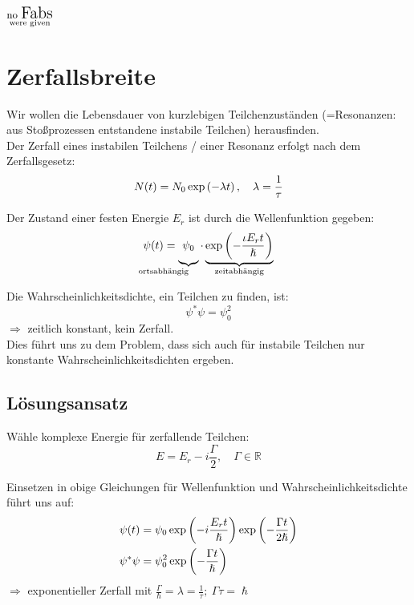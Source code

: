 \documentclass[Ex4_Zusammenfassung.tex]{subfiles}
\begin{document}
\textbf{$\mathop{\text{\small{no} \Large Fabs}}\limits_{\text{were given}}$}
\section{Zerfallsbreite}
Wir wollen die Lebensdauer von kurzlebigen Teilchenzuständen (=Resonanzen: aus Stoßprozessen entstandene instabile Teilchen) herausfinden.\\

Der Zerfall eines instabilen Teilchens / einer Resonanz erfolgt nach dem Zerfallsgesetz:
\begin{equation}
	N(t) = N_0 \exp \left( - \lambda t \right), \quad \lambda = \frac{1}{\tau}
\end{equation}

Der Zustand einer festen Energie $E_r$ ist durch die Wellenfunktion gegeben:
\begin{equation}
	\psi(t) = \underbrace{ \vphantom{\lp - \frac{i E_r t}{\hslash} \rp} \psi_0}_{\mathllap{\text{ortsabhängig}}} \cdot \underbrace{\exp \lp - \frac{\iota E_r t}{\hslash} \rp}_{\mathclap{\text{zeitabhängig}}}
\end{equation}

Die Wahrscheinlichkeitsdichte, ein Teilchen zu finden, ist:
\begin{equation}
	\psi^* \psi = \psi_0^2
\end{equation}
$\Rightarrow$ zeitlich konstant, kein Zerfall.\\
Dies führt uns zu dem Problem, dass sich auch für instabile Teilchen nur konstante Wahrscheinlichkeitsdichten ergeben.

\subsection*{Lösungsansatz}
Wähle komplexe Energie für zerfallende Teilchen:
\begin{equation}
	E = E_r - i \frac{\Gamma}{2}, \quad \Gamma \in \mathbb{R}
\end{equation}

Einsetzen in obige Gleichungen für Wellenfunktion und Wahrscheinlichkeitsdichte führt uns auf:
\begin{align}
	\psi(t) &= \psi_0 \exp \left( -i \frac{E_r t}{\hslash}\right) \exp \left( -\frac{\Gamma t}{2 \hslash} \right)\\
	\psi^* \psi &= \psi_0^2 \exp \left( -\frac{\Gamma t}{\hslash}  \right)
\end{align}
$\Rightarrow$ exponentieller Zerfall mit $\frac{\Gamma}{\hslash} = \lambda = \frac{1}{\tau};\ \Gamma \tau = \hslash$\\
\end{document}
